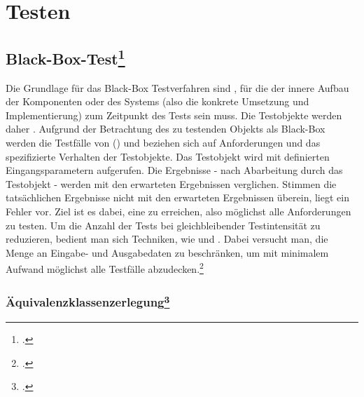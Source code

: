 \documentclass{lehramt-informatik-haupt}
\begin{document}

\chapter{Testen}

\begin{liQuellen}
\item \cite[Kapitel 4 „Software-Text“; Seite 157-246]{hoffmann:software}
\end{liQuellen}

%

\section{Black-Box-Test\footcite[Seite 32]{sosy:fs:5}}

Die Grundlage für das Black-Box Testverfahren sind , für die der innere Aufbau der Komponenten oder des
Systems (also die konkrete Umsetzung und Implementierung) zum Zeitpunkt
des Tests  sein muss. Die Testobjekte werden daher
. Aufgrund der
Betrachtung des zu testenden Objekts als Black-Box werden die Testfälle
von  () und beziehen sich auf
Anforderungen und das spezifizierte Verhalten der Testobjekte. Das
Testobjekt wird mit definierten Eingangsparametern aufgerufen. Die
Ergebnisse - nach Abarbeitung durch das Testobjekt - werden mit den
erwarteten Ergebnissen verglichen. Stimmen die tatsächlichen Ergebnisse
nicht mit den erwarteten Ergebnissen überein, liegt ein Fehler vor. Ziel
ist es dabei, eine  zu
erreichen, also möglichst alle Anforderungen zu testen. Um die Anzahl
der Tests bei gleichbleibender Testintensität zu reduzieren, bedient man
sich Techniken, wie  und
. Dabei versucht man, die Menge an Eingabe- und
Ausgabedaten zu beschränken, um mit minimalem Aufwand möglichst alle
Testfälle abzudecken.\footcite[Seite 140-141]{schatten}

%

\subsection{Äquivalenzklassenzerlegung\footcite[Seite 250]{schneider}}
\end{document}
